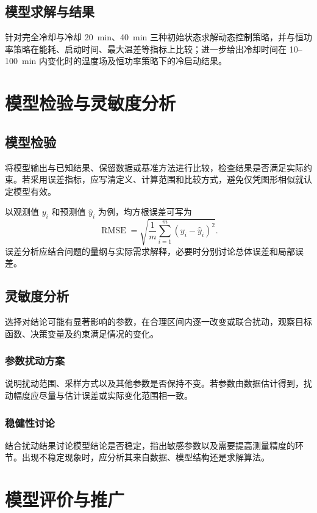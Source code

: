 \documentclass{gmcmthesis}
\begin{document}
\subsection{模型求解与结果}
针对完全冷却与冷却 20~min、40~min 三种初始状态求解动态控制策略，并与恒功率策略在能耗、启动时间、最大温差等指标上比较；进一步给出冷却时间在 10--100~min 内变化时的温度场及恒功率策略下的冷启动结果。

\section{模型检验与灵敏度分析}
\label{sec:validation}

\subsection{模型检验}
将模型输出与已知结果、保留数据或基准方法进行比较，检查结果是否满足实际约束。若采用误差指标，应写清定义、计算范围和比较方式，避免仅凭图形相似就认定模型有效。

以观测值 $y_i$ 和预测值 $\hat y_i$ 为例，均方根误差可写为
\begin{equation}
  \operatorname{RMSE}
  =\sqrt{\frac{1}{m}\sum_{i=1}^{m}(y_i-\hat y_i)^2}.
\end{equation}
误差分析应结合问题的量纲与实际需求解释，必要时分别讨论总体误差和局部误差。

\subsection{灵敏度分析}
选择对结论可能有显著影响的参数，在合理区间内逐一改变或联合扰动，观察目标函数、决策变量及约束满足情况的变化。

\subsubsection{参数扰动方案}
说明扰动范围、采样方式以及其他参数是否保持不变。若参数由数据估计得到，扰动幅度应尽量与估计误差或实际变化范围相一致。

\subsubsection{稳健性讨论}
结合扰动结果讨论模型结论是否稳定，指出敏感参数以及需要提高测量精度的环节。出现不稳定现象时，应分析其来自数据、模型结构还是求解算法。

\section{模型评价与推广}
\end{document}
